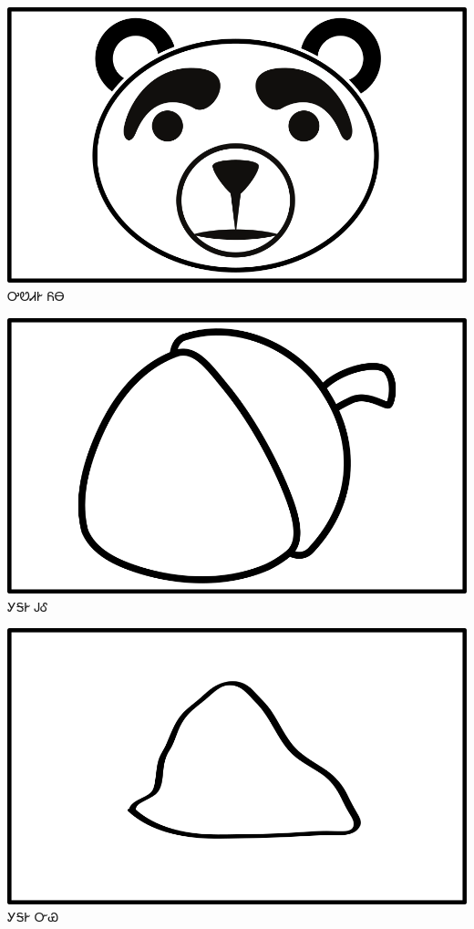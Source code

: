 \documentclass[avery5371]{flashcards}%
\begin{document}
    \begin{flashcard}{
        \includegraphics[width=0.95\columnwidth,height=.51\columnwidth,keepaspectratio]{../artwork/objects-animate/yona}
    }
        \Huge ᎤᏬᏗᎨ ᏲᎾ
    \end{flashcard}

    \begin{flashcard}{
        \includegraphics[width=0.95\columnwidth,height=.51\columnwidth,keepaspectratio]{../artwork/objects-neutral/gule}
    }
        \Huge ᎩᎦᎨ ᎫᎴ
    \end{flashcard}

    \begin{flashcard}{
        \includegraphics[width=0.95\columnwidth,height=.51\columnwidth,keepaspectratio]{../artwork/objects-neutral/nvya}
    }
        \Huge ᎩᎦᎨ ᏅᏯ
    \end{flashcard}
\end{document}
